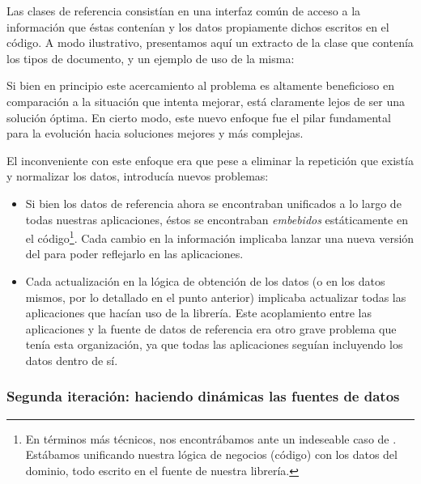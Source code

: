 Las clases de referencia consistían en una interfaz común de acceso a la información que éstas contenían y los datos propiamente dichos escritos en el código. A modo ilustrativo, presentamos aquí un extracto de la clase que contenía los tipos de documento, y un ejemplo de uso de la misma:

\begin{listing}[H]
  \caption{Ejemplo de clase PHP de referencia de la etapa 1 de la nube de servicios}
  \label{nube:ejemplo-php-etapa-1}
\end{listing}

Si bien en principio este acercamiento al problema es altamente beneficioso en comparación a la situación que intenta mejorar, está claramente lejos de ser una solución óptima. En cierto modo, este nuevo enfoque fue el pilar fundamental para la evolución hacia soluciones mejores y más complejas.

El inconveniente con este enfoque era que pese a eliminar la repetición que existía y normalizar los datos, introducía nuevos problemas:

\begin{itemize}
  \item Si bien los datos de referencia ahora se encontraban unificados a lo largo de todas nuestras aplicaciones, éstos se encontraban \textit{embebidos} estáticamente en el código\footnote{En términos más técnicos, nos encontrábamos ante un indeseable caso de . Estábamos unificando nuestra lógica de negocios (código) con los datos del dominio, todo escrito en el fuente de nuestra librería.}. Cada cambio en la información implicaba lanzar una nueva versión del  para poder reflejarlo en las aplicaciones.

  \item Cada actualización en la lógica de obtención de los datos (o en los datos mismos, por lo detallado en el punto anterior) implicaba actualizar todas las aplicaciones que hacían uso de la librería. Este acoplamiento entre las aplicaciones y la fuente de datos de referencia era otro grave problema que tenía esta organización, ya que todas las aplicaciones seguían incluyendo los datos dentro de sí.
\end{itemize}


\subsubsection{Segunda iteración: haciendo dinámicas las fuentes de datos}
\label{nube:etapa2}

